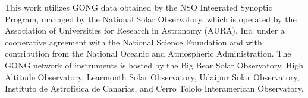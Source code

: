 \documentclass[sigconf]{acmart}
\begin{document}
    This work utilizes GONG data obtained by the NSO Integrated Synoptic Program, managed by the National Solar Observatory, which is operated by the Association of Universities for Research in Astronomy (AURA), Inc. under a cooperative agreement with the National Science Foundation and with contribution from the National Oceanic and Atmospheric Administration. The GONG network of instruments is hosted by the Big Bear Solar Observatory, High Altitude Observatory, Learmonth Solar Observatory, Udaipur Solar Observatory, Instituto de Astrofísica de Canarias, and Cerro Tololo Interamerican Observatory.



\end{document}
